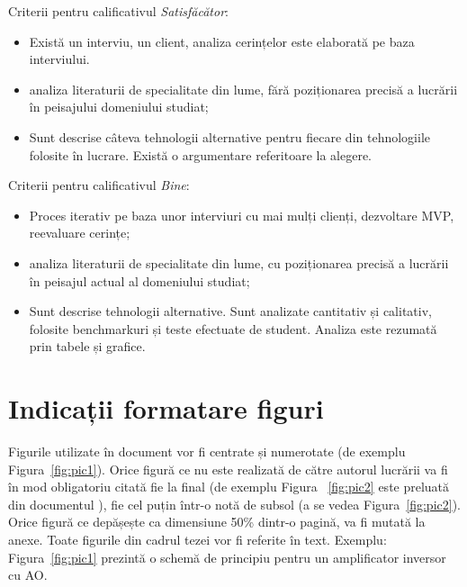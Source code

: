 \documentclass[12pt,a4paper]{report}
\newcommand{\worktype}[1]{[\textit{#1}] }
\newcommand{\dezvoltare}{\worktype{Dezvoltare de produs}}
\newcommand{\cercetare}{\worktype{Cercetare}}
\newcommand{\ambele}{\worktype{Ambele}}
\begin{document}
Criterii pentru calificativul \textit{Satisfăcător}:
\begin{itemize}
	\item \dezvoltare Există un interviu, un client, analiza cerințelor este elaborată pe baza interviului.
	\item \cercetare analiza literaturii de specialitate din lume, fără poziționarea precisă a lucrării în peisajului domeniului studiat;
	\item \ambele Sunt descrise câteva tehnologii alternative pentru fiecare din tehnologiile folosite în lucrare. Există o argumentare referitoare la alegere.
\end{itemize}

Criterii pentru calificativul \textit{Bine}:
\begin{itemize}
	\item \dezvoltare Proces iterativ pe baza unor interviuri cu mai mulți clienți, dezvoltare MVP, reevaluare cerințe;
	\item \cercetare analiza literaturii de specialitate din lume, cu poziționarea precisă a lucrării în peisajul actual al domeniului studiat;
	\item \ambele Sunt descrise tehnologii alternative. Sunt analizate cantitativ și calitativ, folosite benchmarkuri și teste efectuate de student. Analiza este rezumată prin tabele și grafice.
\end{itemize}

\section{Indicații formatare figuri}

Figurile utilizate în document vor fi centrate și numerotate (de exemplu Figura~\ref{fig:pic1}).
Orice figură ce nu este realizată de către autorul lucrării va fi în mod obligatoriu citată fie la final (de exemplu Figura ~\ref{fig:pic2} este preluată din documentul \cite{}), fie cel puțin într-o notă de subsol (a se vedea Figura~\ref{fig:pic2}). Orice figură ce depășește ca dimensiune 50\% dintr-o pagină, va fi mutată la anexe. Toate figurile din cadrul tezei vor fi referite în text. Exemplu: Figura~\ref{fig:pic1} prezintă o schemă de principiu pentru un amplificator inversor cu AO.
\end{document}

